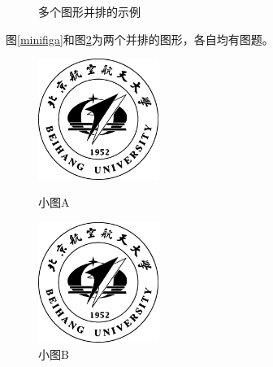 \begin{figure}[htb]
\begin{center}
    \hspace{7em}
    \caption{多个图形并排的示例}
    \label{subfig1}
\end{center}
\end{figure}
图\ref{minifiga}和图\ref{minifigb}为两个并排的图形，各自均有图题。\par
\begin{figure}[htb]
\begin{minipage}{0.5\textwidth}
    \centering
    \includegraphics[width=0.35\textwidth]{figure/buaamark.eps}
    \caption{小图A}
    \label{minifiga}
\end{minipage}
\begin{minipage}{0.5\textwidth}
    \centering
    \includegraphics[width=0.35\textwidth]{figure/buaamark.eps}
    \caption{小图B}
    \label{minifigb}
\end{minipage}
\end{figure}
